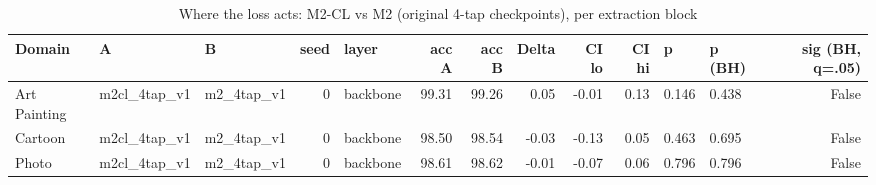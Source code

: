 \begin{table}
\caption{Where the loss acts: M2-CL vs M2 (original 4-tap checkpoints), per extraction block}
\label{tab:leak_cl_effect_at_taps_v1}
\begin{tabular}{lllrlrrrrrllr}
\toprule
Domain & A & B & seed & layer & acc A & acc B & Delta & CI lo & CI hi & p & p (BH) & sig (BH, q=.05) \\
\midrule
Art Painting & m2cl\_4tap\_v1 & m2\_4tap\_v1 & 0 & backbone & 99.31 & 99.26 & 0.05 & -0.01 & 0.13 & 0.146 & 0.438 & False \\
Cartoon & m2cl\_4tap\_v1 & m2\_4tap\_v1 & 0 & backbone & 98.50 & 98.54 & -0.03 & -0.13 & 0.05 & 0.463 & 0.695 & False \\
Photo & m2cl\_4tap\_v1 & m2\_4tap\_v1 & 0 & backbone & 98.61 & 98.62 & -0.01 & -0.07 & 0.06 & 0.796 & 0.796 & False \\
\bottomrule
\end{tabular}
\end{table}
